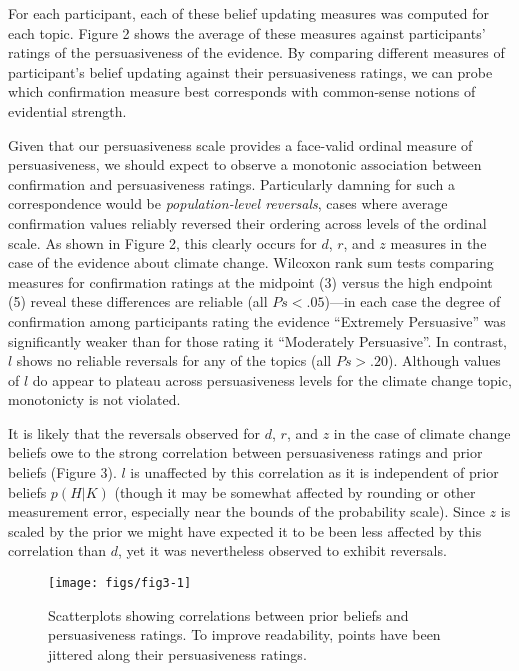 \documentclass[10pt, letterpaper]{article}
\newenvironment{CodeChunk}{}{}
\begin{document}
For each participant, each of these belief updating measures was
computed for each topic. Figure 2 shows the average of these measures
against participants' ratings of the persuasiveness of the evidence. By
comparing different measures of participant's belief updating against
their persuasiveness ratings, we can probe which confirmation measure
best corresponds with common-sense notions of evidential strength.

Given that our persuasiveness scale provides a face-valid ordinal
measure of persuasiveness, we should expect to observe a monotonic
association between confirmation and persuasiveness ratings.
Particularly damning for such a correspondence would be
\emph{population-level reversals}, cases where average confirmation
values reliably reversed their ordering across levels of the ordinal
scale. As shown in Figure 2, this clearly occurs for \(d\), \(r\), and
\(z\) measures in the case of the evidence about climate change.
Wilcoxon rank sum tests comparing measures for confirmation ratings at
the midpoint (3) versus the high endpoint (5) reveal these differences
are reliable (all \(Ps < .05\))---in each case the degree of
confirmation among participants rating the evidence ``Extremely
Persuasive'' was significantly weaker than for those rating it
``Moderately Persuasive''. In contrast, \(l\) shows no reliable
reversals for any of the topics (all \(Ps > .20\)). Although values of
\(l\) do appear to plateau across persuasiveness levels for the climate
change topic, monotonicty is not violated.

It is likely that the reversals observed for \(d\), \(r\), and \(z\) in
the case of climate change beliefs owe to the strong correlation between
persuasiveness ratings and prior beliefs (Figure 3). \(l\) is unaffected
by this correlation as it is independent of prior beliefs \(p(H|K)\)
(though it may be somewhat affected by rounding or other measurement
error, especially near the bounds of the probability scale). Since \(z\)
is scaled by the prior we might have expected it to be been less
affected by this correlation than \(d\), yet it was nevertheless
observed to exhibit reversals.

\begin{CodeChunk}
\begin{figure}[tb]

{\centering \texttt{[image: figs/fig3-1]} 

}

\caption[Scatterplots showing correlations between prior beliefs and persuasiveness ratings]{Scatterplots showing correlations between prior beliefs and persuasiveness ratings. To improve readability, points have been jittered along their persuasiveness ratings.}\label{fig:fig3}
\end{figure}
\end{CodeChunk}
\end{document}
